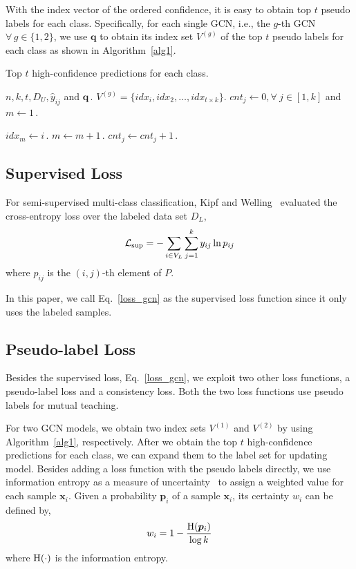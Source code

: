 \documentclass{article}
\newcommand{\x}{{\bm x}}
\newcommand{\q}{{\bm q}}
\begin{document}
With the index vector of the ordered confidence, it is easy to obtain top $t$ pseudo labels for each class. Specifically, for each single GCN, i.e., the $g$-th GCN $\forall\,g\in\{1,2\}$, we use $\q$ to obtain its index set $V^{(g)}$ of the top $t$ pseudo labels for each class as shown in Algorithm~\ref{alg1}.
\begin{algorithm}[!htbp]
\caption{Top $t$ high-confidence predictions for each class.}\label{alg1}
\begin{algorithmic}[1]
 $n,k,t,D_U,\hat{y}_{ij}$ and $\q$\,.
 $V^{(g)}=\{idx_i,idx_2,\ldots,idx_{t\times k}\}$.
 $cnt_j\leftarrow0,\forall~j\in[1,k]$ and $m\leftarrow1$\,.

            \State $idx_m\leftarrow i$\,.
            \State $m\leftarrow m+1$\,.
            \State $cnt_j\leftarrow cnt_j+1$\,.
        \EndIf
    \EndFor
\EndFor
\end{algorithmic}
\end{algorithm}
\subsection{Supervised Loss}
For semi-supervised multi-class classification, Kipf and Welling~\cite{kipf2016semi} evaluated the cross-entropy loss over the labeled data set $D_L$,
\begin{equation}\label{loss_gcn}
\mathcal{L}_{\rm sup}=-\sum_{i\in V_L}\sum_{j=1}^k y_{ij}\ln p_{ij}
\end{equation}
where $p_{ij}$ is the $(i,j)$-th element of $P$.

In this paper, we call Eq.~\eqref{loss_gcn} as the supervised loss function since it only uses the labeled samples.
\subsection{Pseudo-label Loss}
Besides the supervised loss, Eq.~\eqref{loss_gcn}, we exploit two other loss functions, a pseudo-label loss and a consistency loss. Both the two loss functions use pseudo labels for mutual teaching.

For two GCN models, we obtain two index sets $V^{(1)}$ and $V^{(2)}$ by using Algorithm~\ref{alg1}, respectively. After we obtain the top $t$ high-confidence predictions for each class, we can expand them to the label set for updating model. Besides adding a loss function with the pseudo labels directly, we use information entropy as a measure of uncertainty~\cite{iscen2019label} to assign a weighted value for each sample $\x_i$. Given a probability $\bm{p}_i$ of a sample $\x_i$, its certainty $w_i$ can be defined by,
\begin{equation}\label{certainty}
w_i=1-\frac{{\rm H}(\bm{p}_i)}{\log k}
\end{equation}
where ${\rm H}(\cdot)$ is the information entropy.
\end{document}
